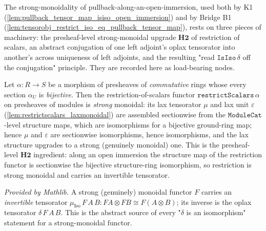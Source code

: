 The strong-monoidality of pullback-along-an-open-immersion, used both by K1
(\cref{lem:pullback_tensor_map_isiso_open_immersion}) and by Bridge B1
(\cref{lem:tensorobj_restrict_iso_eq_pullback_tensor_map}), rests on three pieces of machinery: the
presheaf-level strong-monoidal upgrade \(\mathbf{H2}\) of restriction of scalars, an abstract
conjugation of one left adjoint's oplax tensorator into another's across uniqueness of left
adjoints, and the resulting "read \(\mathtt{IsIso}\,\delta\) off the conjugation" principle. They are
recorded here as load-bearing nodes.

\begin{lemma}
  \label{lem:restrictscalars_monoidal_of_bijective}
  Let \(\alpha : R \to S\) be a morphism of presheaves of \emph{commutative} rings whose every
  section \(\alpha_U\) is \emph{bijective}. Then the restriction-of-scalars functor
  \(\mathtt{restrictScalars}\,\alpha\) on presheaves of modules is \emph{strong} monoidal: its lax
  tensorator \(\mu\) and lax unit \(\varepsilon\) (\cref{lem:restrictscalars_laxmonoidal}) are
  assembled sectionwise from the \(\mathtt{ModuleCat}\)-level structure maps, which are isomorphisms
  for a bijective ground-ring map; hence \(\mu\) and \(\varepsilon\) are sectionwise isomorphisms,
  hence isomorphisms, and the lax structure upgrades to a strong (genuinely monoidal) one. This is
  the presheaf-level \(\mathbf{H2}\) ingredient: along an open immersion the structure map of the
  restriction functor is sectionwise the bijective structure-ring isomorphism, so restriction is
  strong monoidal and carries an invertible tensorator.
\end{lemma}

\begin{lemma}
  \label{lem:functor_monoidal_muiso}
  \mathlibok
  \textit{Provided by Mathlib.}
  A strong (genuinely) monoidal functor \(F\) carries an \emph{invertible} tensorator
  \(\mu_{\mathrm{Iso}}\,F\,A\,B : F A \otimes F B \cong F(A \otimes B)\); its inverse is the oplax
  tensorator \(\delta\,F\,A\,B\). This is the abstract source of every "\(\delta\) is an
  isomorphism" statement for a strong-monoidal functor.
\end{lemma}

